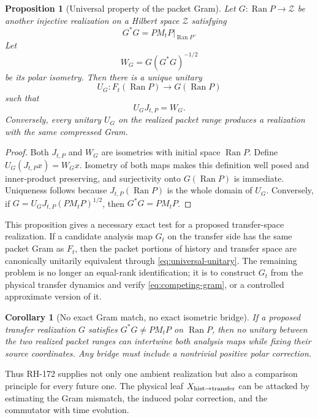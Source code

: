 \documentclass[12pt]{article}
\newtheorem{proposition}[theorem]{Proposition}
\newtheorem{corollary}[theorem]{Corollary}
\theoremstyle{definition}
\theoremstyle{remark}
\newcommand{\Ran}{\operatorname{Ran}}
\begin{document}
\begin{proposition}[Universal property of the packet Gram]
\label{prop:universal}
Let $G:\Ran P\to\mathcal Z$ be another injective realization on a Hilbert
space $\mathcal Z$ satisfying
\begin{equation}\label{eq:competing-gram}
 G^*G=PM_tP|_{\Ran P}.
\end{equation}
Let
\[
 W_G=G(G^*G)^{-1/2}
\]
be its polar isometry.  Then there is a unique unitary
\[
 U_G:F_t(\Ran P)\longrightarrow G(\Ran P)
\]
such that
\begin{equation}\label{eq:universal-unitary}
 U_GJ_{t,P}=W_G.
\end{equation}
Conversely, every unitary $U_G$ on the realized packet range produces a
realization with the same compressed Gram.
\end{proposition}

\begin{proof}
Both $J_{t,P}$ and $W_G$ are isometries with initial space $\Ran P$.
Define $U_G(J_{t,P}x)=W_Gx$.  Isometry of both maps makes this definition
well posed and inner-product preserving, and surjectivity onto $G(\Ran P)$
is immediate.  Uniqueness follows because $J_{t,P}(\Ran P)$ is the whole
domain of $U_G$.  Conversely, if
$G=U_GJ_{t,P}(PM_tP)^{1/2}$, then $G^*G=PM_tP$.
\end{proof}

This proposition gives a necessary exact test for a proposed transfer-space
realization.  If a candidate analysis map $G_t$ on the transfer side has the
same packet Gram as $F_t$, then the packet portions of history and transfer
space are canonically unitarily equivalent through
\eqref{eq:universal-unitary}.  The remaining problem is no longer an
equal-rank identification; it is to construct $G_t$ from the physical
transfer dynamics and verify \eqref{eq:competing-gram}, or a controlled
approximate version of it.

\begin{corollary}[No exact Gram match, no exact isometric bridge]
If a proposed transfer realization $G$ satisfies
$G^*G\ne PM_tP$ on $\Ran P$, then no unitary between the two realized packet
ranges can intertwine both analysis maps while fixing their source
coordinates.  Any bridge must include a nontrivial positive polar correction.
\end{corollary}

Thus RH-172 supplies not only one ambient realization but also a comparison
principle for every future one.  The physical leaf
$X_{\rm hist\to transfer}$ can be attacked by estimating the Gram mismatch,
the induced polar correction, and the commutator with time evolution.
\end{document}
